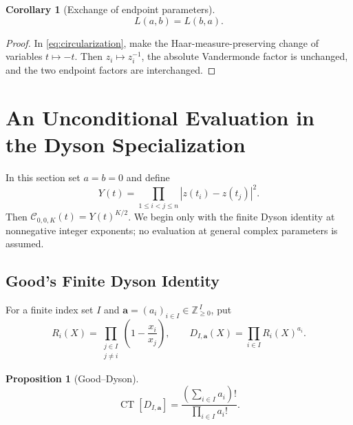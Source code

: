 \documentclass[11pt,a4paper]{article}
\newtheorem{proposition}[theorem]{Proposition}
\newtheorem{corollary}[theorem]{Corollary}
\theoremstyle{definition}
\newcommand{\CT}{\operatorname{CT}}
\begin{document}
\begin{corollary}[Exchange of endpoint parameters]\label{cor:swap}
\[
 L(a,b)=L(b,a).
\]
\end{corollary}

\begin{proof}
In \eqref{eq:circularization}, make the Haar-measure-preserving change of
variables $t\mapsto-t$. Then $z_i\mapsto z_i^{-1}$, the absolute
Vandermonde factor is unchanged, and the two endpoint factors are
interchanged.
\end{proof}

\section{An Unconditional Evaluation in the Dyson Specialization}
\label{sec:dyson}

In this section set $a=b=0$ and define
\begin{equation}\label{eq:Y}
Y(t)=\prod_{1\le i<j\le n}|z(t_i)-z(t_j)|^2.
\end{equation}
Then $\mathcal C_{0,0,K}(t)=Y(t)^{K/2}$. We begin only with the finite
Dyson identity at nonnegative integer exponents; no evaluation at general
complex parameters is assumed.

\subsection{Good's Finite Dyson Identity}

For a finite index set $I$ and
$\bm a=(a_i)_{i\in I}\in\mathbb Z_{\ge0}^{\,I}$, put
\[
 R_i(X)=\prod_{\substack{j\in I\\j\ne i}}
 \left(1-\frac{x_i}{x_j}\right),\qquad
 D_{I,\bm a}(X)=\prod_{i\in I}R_i(X)^{a_i}.
\]

\begin{proposition}[Good--Dyson]\label{prop:good}
\begin{equation}\label{eq:good}
 \CT[D_{I,\bm a}]
 =\frac{\left(\sum_{i\in I}a_i\right)!}{\prod_{i\in I}a_i!}.
\end{equation}
\end{proposition}
\end{document}
